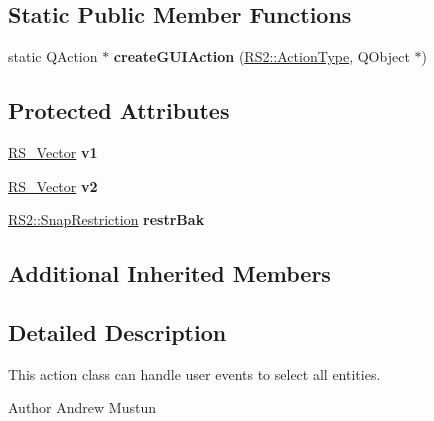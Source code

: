 \subsection*{Static Public Member Functions}
\begin{DoxyCompactItemize}
\item 
\hypertarget{classRS__ActionDefault_af075bcd42af2c528246c1d0995311e92}{static Q\-Action $\ast$ {\bfseries create\-G\-U\-I\-Action} (\hyperlink{classRS2_afe3523e0bc41fd637b892321cfc4b9d7}{R\-S2\-::\-Action\-Type}, Q\-Object $\ast$)}\label{classRS__ActionDefault_af075bcd42af2c528246c1d0995311e92}

\end{DoxyCompactItemize}
\subsection*{Protected Attributes}
\begin{DoxyCompactItemize}
\item 
\hypertarget{classRS__ActionDefault_a459c3a50869296fe92c9852fd1c4321a}{\hyperlink{classRS__Vector}{R\-S\-\_\-\-Vector} {\bfseries v1}}\label{classRS__ActionDefault_a459c3a50869296fe92c9852fd1c4321a}

\item 
\hypertarget{classRS__ActionDefault_a0337596df72bb7d79be2c3eb99d955ae}{\hyperlink{classRS__Vector}{R\-S\-\_\-\-Vector} {\bfseries v2}}\label{classRS__ActionDefault_a0337596df72bb7d79be2c3eb99d955ae}

\item 
\hypertarget{classRS__ActionDefault_a9bc6d992a5b1ab6a4b3ece23abc7fe66}{\hyperlink{classRS2_aac67b6890a08cff619c0fbef48377bae}{R\-S2\-::\-Snap\-Restriction} {\bfseries restr\-Bak}}\label{classRS__ActionDefault_a9bc6d992a5b1ab6a4b3ece23abc7fe66}

\end{DoxyCompactItemize}
\subsection*{Additional Inherited Members}


\subsection{Detailed Description}
This action class can handle user events to select all entities.

\begin{DoxyAuthor}{Author}
Andrew Mustun 
\end{DoxyAuthor}


